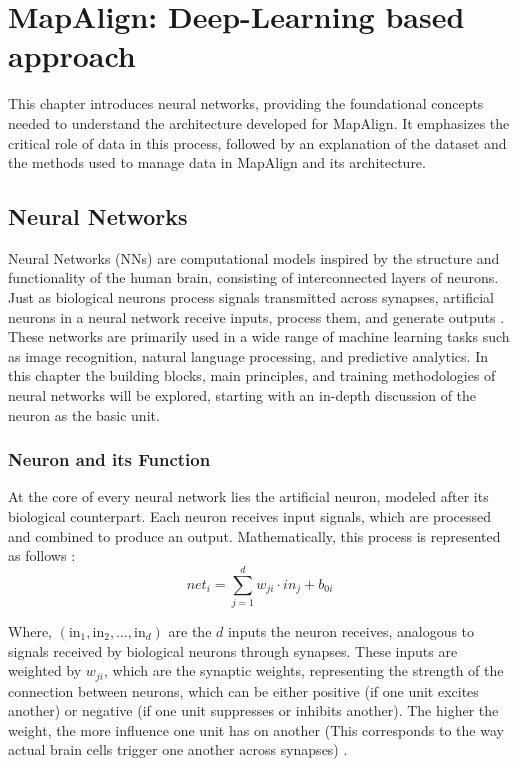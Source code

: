 \chapter{MapAlign: Deep-Learning based approach}

This chapter introduces neural networks, providing the foundational concepts needed to understand the architecture developed for MapAlign. It emphasizes the critical role of data in this process, followed by an explanation of the dataset and the methods used to manage data in MapAlign and its architecture. 

\section{Neural Networks}
Neural Networks (NNs) are computational models inspired by the structure and functionality of the human brain, consisting of interconnected layers of neurons. Just as biological neurons process signals transmitted across synapses, artificial neurons in a neural network receive inputs, process them, and generate outputs \cite{Grosan2011}. These networks are primarily used in a wide range of machine learning tasks such as image recognition, natural language processing, and predictive analytics.
In this chapter the building blocks, main principles, and training methodologies of neural networks will be explored, starting with an in-depth discussion of the neuron as the basic unit.

\subsection{Neuron and its Function}
At the core of every neural network lies the artificial neuron, modeled after its biological counterpart. Each neuron receives input signals, which are processed and combined to produce an output. Mathematically, this process is represented as follows \cite{10.11648/j.ajnna.20190501.12}:
\begin{equation}
    \textit{net}_i = \sum_{j=1}^{d} w_{ji} \cdot \textit{in}_j + b_{0i}
\end{equation}

Where, $(\text{in}_1, \text{in}_2, \ldots, \text{in}_d)$ are the $d$ inputs the neuron receives, analogous to signals received by biological neurons through synapses. These inputs are weighted by $w_{ji}$, which are the synaptic weights, representing the strength of the connection between neurons, which can be either positive (if one unit excites another) or negative (if one unit suppresses or inhibits another). The higher the weight, the more influence one unit has on another (This corresponds to the way actual brain cells trigger one another across synapses) \cite{10.11648/j.ajnna.20190501.12}.

